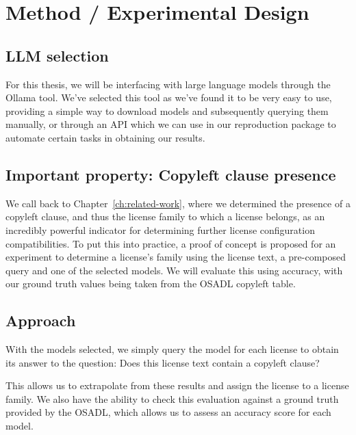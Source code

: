 
\chapter{Method / Experimental Design}\label{ch:method}

\section{LLM selection}


For this thesis, we will be interfacing with large language models through the Ollama tool. We've selected this tool as we've found it to be very easy to use, providing a simple way to download models and subsequently querying them manually, or through an API which we can use in our reproduction package to automate certain tasks in obtaining our results.


 
\section{Important property: Copyleft clause presence}

We call back to Chapter~\ref{ch:related-work}, where we determined the presence of a copyleft clause, and thus the license family to which a license belongs, as an incredibly powerful indicator for determining further license configuration compatibilities. To put this into practice, a proof of concept is proposed for an experiment to determine a license's family using the license text, a pre-composed query and one of the selected models. We will evaluate this using accuracy, with our ground truth values being taken from the OSADL copyleft table.

\section{Approach}

With the models selected, we simply query the model for each license to obtain its answer to the question: Does this license text contain a copyleft clause?

This allows us to extrapolate from these results and assign the license to a license family. We also have the ability to check this evaluation against a ground truth provided by the OSADL, which allows us to assess an accuracy score for each model. \\

